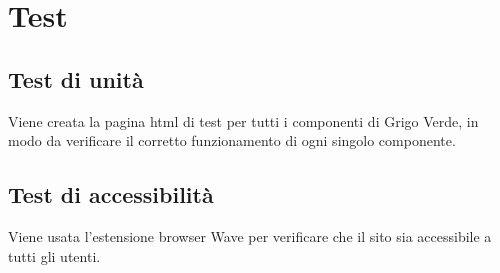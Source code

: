 \section{Test}

\subsection{Test di unità}

Viene creata la pagina html di test per tutti i componenti di Grigo Verde, in
modo da verificare il corretto funzionamento di ogni singolo componente.

\subsection{Test di accessibilità}

Viene usata l'estensione browser Wave per verificare che il sito sia accessibile
a tutti gli utenti.
